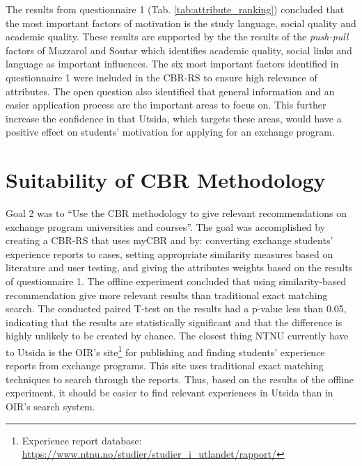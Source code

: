 The results from questionnaire 1 (Tab. \ref{tab:attribute_ranking}) concluded that the most important factors of motivation is the study language, social quality and academic quality. These results are supported by the the results of the \emph{push-pull} factors of Mazzarol and Soutar \cite{mazzarol2002push} which identifies academic quality, social links and language as important influences. The six most important factors identified in questionnaire 1 were included in the CBR-RS to ensure high relevance of attributes. The open question also identified that general information and an easier application process are the important areas to focus on. This further increase the confidence in that Utsida, which targets these areas, would have a positive effect on students' motivation for applying for an exchange program.



\section{Suitability of CBR Methodology}

Goal 2 was to \enquote{Use the CBR methodology to give relevant recommendations on exchange program universities and courses}. The goal was accomplished by creating a CBR-RS that uses myCBR and by: converting exchange students' experience reports to cases, setting appropriate similarity measures based on literature and user testing, and giving the attributes weights based on the results of questionnaire 1. The offline experiment concluded that using similarity-based recommendation give more relevant results than traditional exact matching search. The conducted paired T-test on the results had a p-value less than 0.05, indicating that the results are statistically significant and that the difference is highly unlikely to be created by chance. The closest thing NTNU currently have to Utsida is the OIR's site\footnote{Experience report database: \url{https://www.ntnu.no/studier/studier_i_utlandet/rapport/}} for publishing and finding students' experience reports from exchange programs. This site uses traditional exact matching techniques to search through the reports. Thus, based on the results of the offline experiment, it should be easier to find relevant experiences in Utsida than in OIR's search system. 

